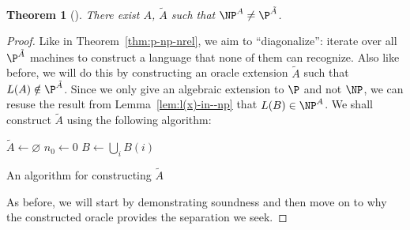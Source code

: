 \documentclass{reedthesis}
\theoremstyle{plain}
\newtheorem{thm}{Theorem}[section]
\theoremstyle{definition}
\theoremstyle{remark}
\numberwithin{equation}{section}
\begin{document}
\begin{thm}[{\cite[Theorem 5.3]{AW09}}]\label{thm:p-np-nalg}
  There exist $A$, $\tilde{A}$ such that $\NP^{A} \ne \P^{\tilde{A}}$.
\end{thm}

\begin{proof}
  Like in Theorem~\ref{thm:p-np-nrel}, we aim to ``diagonalize'': iterate over
  all $\P^{\tilde{A}}$ machines to construct a language that none of them can
  recognize. Also like before, we will do this by constructing an oracle
  extension $\tilde{A}$ such that $L(A) \notin \P^{\tilde{A}}$. Since we only give an
  algebraic extension to $\P$ and not $\NP$, we can resuse the result from
  Lemma~\ref{lem:l(x)-in--np} that $L(B) \in \NP^{A}$. We shall construct
  $\tilde{A}$ using the following algorithm:
  \begin{algorithm}[H]
    $\tilde{A} \leftarrow \varnothing$\;
    $n_{0} \leftarrow 0$\;
    $B \leftarrow \bigcup_{i}B(i)$\;
    \caption{An algorithm for constructing $\tilde{A}$}\label{alg:construct-b}
  \end{algorithm}
  As before, we will start by demonstrating soundness and then move on to why
  the constructed oracle provides the separation we seek.
\end{proof}

\printbibliography[heading=bibintoc]{}

\printindex{}
\end{document}
